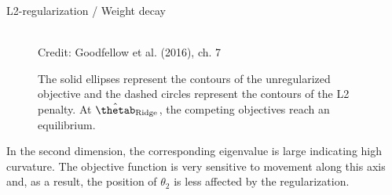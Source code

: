 \begin{vbframe}{L2-regularization / Weight decay}
\begin{figure}
\centering
{}
\tiny{\\ Credit: Goodfellow et al. (2016), ch. 7}
\caption{\footnotesize The solid ellipses represent the contours of the unregularized objective and the dashed circles represent the contours of the L2 penalty. At $\hat{\thetab}_{\text{Ridge}}$, the competing objectives reach an equilibrium.}
\end{figure}
In the second dimension, the corresponding eigenvalue is large indicating high curvature. The objective function is very sensitive to movement along this axis and, as a result, the position of $\theta_2$ is less affected by the regularization.
\end{vbframe}

